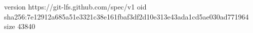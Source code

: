 version https://git-lfs.github.com/spec/v1
oid sha256:7e12912a685a51e3321c38e161fbaf3df2d10e313e43ada1cd5ae030ad771964
size 43840
